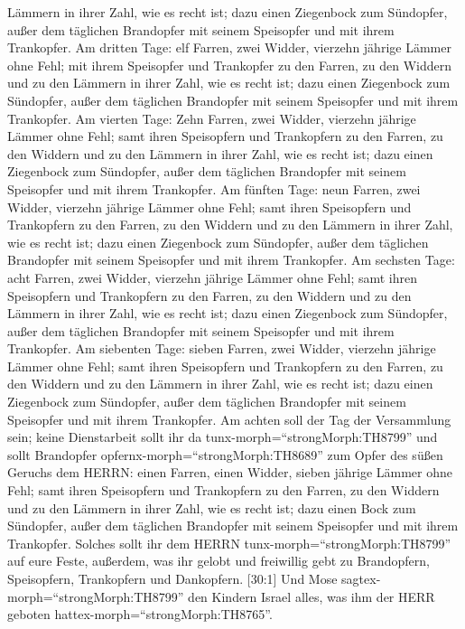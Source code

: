 Lämmern in ihrer Zahl, wie es recht ist;  dazu einen
Ziegenbock zum Sündopfer, außer dem täglichen Brandopfer mit seinem
Speisopfer und mit ihrem Trankopfer.  Am dritten Tage: elf
Farren, zwei Widder, vierzehn jährige Lämmer ohne Fehl; 
mit ihrem Speisopfer und Trankopfer zu den Farren, zu den Widdern und zu
den Lämmern in ihrer Zahl, wie es recht ist;  dazu einen
Ziegenbock zum Sündopfer, außer dem täglichen Brandopfer mit seinem
Speisopfer und mit ihrem Trankopfer.  Am vierten Tage: Zehn
Farren, zwei Widder, vierzehn jährige Lämmer ohne Fehl; 
samt ihren Speisopfern und Trankopfern zu den Farren, zu den Widdern und
zu den Lämmern in ihrer Zahl, wie es recht ist;  dazu einen
Ziegenbock zum Sündopfer, außer dem täglichen Brandopfer mit seinem
Speisopfer und mit ihrem Trankopfer.  Am fünften Tage: neun
Farren, zwei Widder, vierzehn jährige Lämmer ohne Fehl; 
samt ihren Speisopfern und Trankopfern zu den Farren, zu den Widdern und
zu den Lämmern in ihrer Zahl, wie es recht ist;  dazu einen
Ziegenbock zum Sündopfer, außer dem täglichen Brandopfer mit seinem
Speisopfer und mit ihrem Trankopfer.  Am sechsten Tage:
acht Farren, zwei Widder, vierzehn jährige Lämmer ohne Fehl;
 samt ihren Speisopfern und Trankopfern zu den Farren, zu
den Widdern und zu den Lämmern in ihrer Zahl, wie es recht ist;
 dazu einen Ziegenbock zum Sündopfer, außer dem täglichen
Brandopfer mit seinem Speisopfer und mit ihrem Trankopfer. 
Am siebenten Tage: sieben Farren, zwei Widder, vierzehn jährige Lämmer
ohne Fehl;  samt ihren Speisopfern und Trankopfern zu den
Farren, zu den Widdern und zu den Lämmern in ihrer Zahl, wie es recht
ist;  dazu einen Ziegenbock zum Sündopfer, außer dem
täglichen Brandopfer mit seinem Speisopfer und mit ihrem Trankopfer.
 Am achten soll der Tag der Versammlung sein; keine
Dienstarbeit sollt ihr da tunx-morph=``strongMorph:TH8799''
 und sollt Brandopfer opfernx-morph=``strongMorph:TH8689''
zum Opfer des süßen Geruchs dem HERRN: einen Farren, einen Widder,
sieben jährige Lämmer ohne Fehl;  samt ihren Speisopfern
und Trankopfern zu den Farren, zu den Widdern und zu den Lämmern in
ihrer Zahl, wie es recht ist;  dazu einen Bock zum
Sündopfer, außer dem täglichen Brandopfer mit seinem Speisopfer und mit
ihrem Trankopfer.  Solches sollt ihr dem HERRN
tunx-morph=``strongMorph:TH8799'' auf eure Feste, außerdem, was ihr
gelobt und freiwillig gebt zu Brandopfern, Speisopfern, Trankopfern und
Dankopfern.  {[}30:1{]} Und Mose
sagtex-morph=``strongMorph:TH8799'' den Kindern Israel alles, was ihm
der HERR geboten hattex-morph=``strongMorph:TH8765''.

